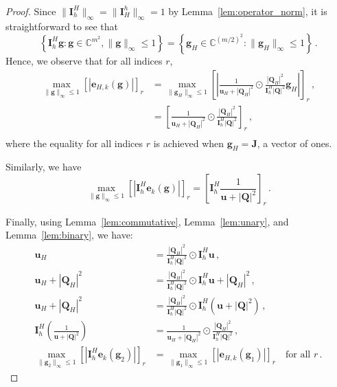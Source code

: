 \documentclass{article}
\numberwithin{equation}{section}
\begin{document}
\begin{proof}
Since $\|\bm{I}_h^H\|_\infty  = \|\bm{I}_H^h\|_\infty = 1$ by Lemma~\ref{lem:operator_norm}, it is straightforward to see that
\begin{equation*}
    \left\{\bm{I}_h^H\bm{g}:\bm{g}\in\mathbb{C}^{m^2},\|\bm{g}\|_\infty\leq1\right\} = \left\{\bm{g}_H\in\mathbb{C}^{(m/2)^2}:\|\bm{g}_H\|_\infty\leq1\right\}\,.
\end{equation*}
Hence, we observe that for all indices $r$,
\begin{equation*}
\begin{aligned}
    \max_{\|\bm{g}\|_\infty\leq1}\left[\left|\bm{e}_{H,k}(\bm{g})\right|\right]_r &= \max_{\|\bm{g}_H\|_\infty\leq1}\left[\left|\frac{1}{\bm{u}_H+|\bm{Q}_H|^2}\odot\frac{|\bm{Q}_H|^2}{\bm{I}_h^H|\bm{Q}|^2}\bm{g}_H\right|\right]_r\,,\\
    &= \left[\frac{1}{\bm{u}_H+|\bm{Q}_H|^2}\odot\frac{|\bm{Q}_H|^2}{\bm{I}_h^H|\bm{Q}|^2}\right]_r\,,\\
\end{aligned}
\end{equation*}
where the equality for all indices $r$ is achieved when $\bm{g}_H=\bm{J}$, a vector of ones.

Similarly, we have
\begin{equation*}
    \max_{\|\bm{g}\|_\infty\leq1} \left[\left|\bm{I}_h^H\bm{e}_k(\bm{g})\right|\right]_r = \left[\bm{I}_h^H\frac{1}{\bm{u}+|\bm{Q}|^2}\right]_r\,.
\end{equation*}

Finally, using Lemma~\ref{lem:commutative}, Lemma~\ref{lem:unary}, and Lemma~\ref{lem:binary}, we have:
\begin{equation*}
    \begin{aligned}
        \bm{u}_H &=  \frac{|\bm{Q}_H|^2}{\bm{I}_h^H|\bm{Q}|^2}\odot\bm{I}_h^H\bm{u}\,,\\
        \bm{u}_H + |\bm{Q}_H|^2&= \frac{|\bm{Q}_H|^2}{\bm{I}_h^H|\bm{Q}|^2}\odot\bm{I}_h^H\bm{u}+|\bm{Q}_H|^2\,,\\
        \bm{u}_H + |\bm{Q}_H|^2&= \frac{|\bm{Q}_H|^2}{\bm{I}_h^H|\bm{Q}|^2}\odot\bm{I}_h^H\left(\bm{u}+|\bm{Q}|^2\right)\,,\\
        \bm{I}_h^H\left(\frac{1}{\bm{u}+|\bm{Q}|^2}\right)&= \frac{1}{\bm{u}_H + |\bm{Q}_H|^2}\odot\frac{|\bm{Q}_H|^2}{\bm{I}_h^H|\bm{Q}|^2}\,,\\
        \max_{\|\bm{g}_2\|_\infty\leq1} \left[\left|\bm{I}_h^H\bm{e}_k(\bm{g}_2)\right|\right]_r &= \max_{\|\bm{g}_1\|_\infty\leq1}\left[\left|\bm{e}_{H,k}(\bm{g}_1)\right|\right]_r\quad\text{for all }r\,.
    \end{aligned}
\end{equation*}
\end{proof}
\end{document}
